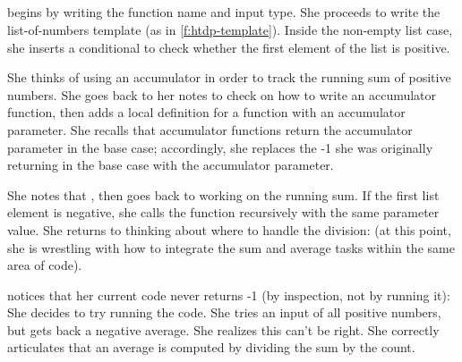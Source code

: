 \subsection{\sthree}
\label{s:sthree}

\sthree begins by writing the function name and input type.  She
proceeds to write the list-of-numbers template (as in
\cref{f:htdp-template}). Inside the non-empty list case, she inserts
a conditional to check whether the first element of the list is
positive.

She thinks of using an accumulator in order to
track the running sum of positive numbers. She goes back to her notes
to check on how to write an accumulator function, then adds a local
definition for a function with an accumulator parameter.  She recalls
that accumulator functions return the accumulator parameter in the
base case; accordingly, she replaces the -1 she was originally
returning in the base case with the accumulator parameter.

She notes that ,
then goes back to working on the running sum.  If the first list
element is negative, she calls the function recursively with the
same parameter value.  She returns to thinking about where to handle
the division:  (at this point, she is wrestling with how to integrate
the sum and average tasks within the same area of code).

\sthree notices that her current code never returns -1 (by inspection,
not by running it):
 She decides to try running the
code. She tries an input of all positive numbers, but gets back
a negative average.  She realizes this can't be right.
She correctly articulates that an average is computed by dividing the
sum by the count.

